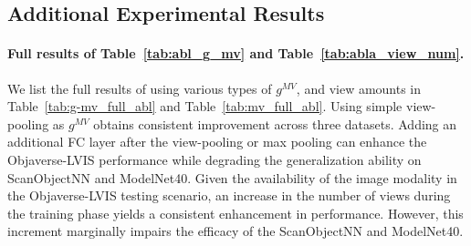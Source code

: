 \documentclass{article} \usepackage{iclr2024_conference,times}
\begin{document}
\begin{table*}[thpb]
\centering
  \renewcommand\tabcolsep{2pt}
  \caption{The ablations of inference schemes under different settings of views ($M$).}
  \label{tab:mv-mm_joint_abl}
\end{table*} 
\subsection{Additional Experimental Results}
\paragraph{Full results of Table~\ref{tab:abl_g_mv} and Table~\ref{tab:abla_view_num}.}
We list the full results of using various types of $g^{MV}$, and view amounts in Table~\ref{tab:g-mv_full_abl} and Table~\ref{tab:mv_full_abl}.
Using simple view-pooling as $g^{MV}$ obtains consistent improvement across three datasets. 
Adding an additional FC layer after the view-pooling or max pooling can enhance the Objaverse-LVIS performance while degrading the generalization ability on ScanObjectNN and ModelNet40.
Given the availability of the image modality in the Objaverse-LVIS testing scenario, an increase in the number of views during the training phase yields a consistent enhancement in performance. 
However, this increment marginally impairs the efficacy of the ScanObjectNN and ModelNet40.
\end{document}
